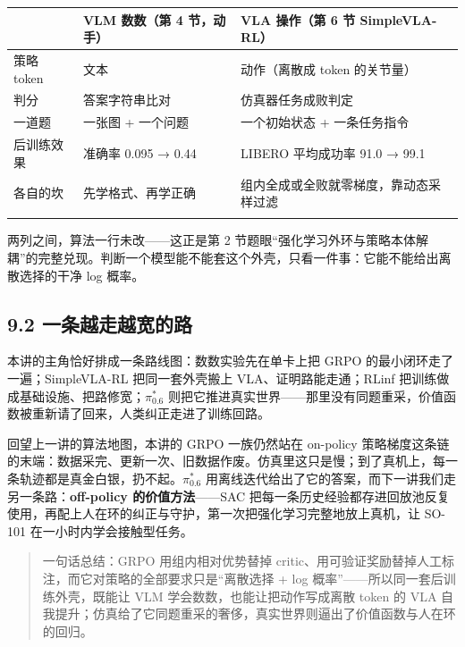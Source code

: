 \documentclass[
  chinese,
]{ctexart}
\begin{document}
\begin{center}
\begin{tabular}{@{}>{\raggedright\arraybackslash}p{} >{\raggedright\arraybackslash}p{} >{\raggedright\arraybackslash}p{}@{}}
\toprule\noalign{}
 & VLM 数数（第 4 节，动手） & VLA 操作（第 6 节 SimpleVLA-RL） \\
\midrule\noalign{}
策略 token & 文本 & 动作（离散成 token 的关节量） \\
判分 & 答案字符串比对 & 仿真器任务成败判定 \\
一道题 & 一张图 + 一个问题 & 一个初始状态 + 一条任务指令 \\
后训练效果 & 准确率 0.095 → 0.44 & LIBERO 平均成功率 91.0 → 99.1 \\
各自的坎 & 先学格式、再学正确 & 组内全成或全败就零梯度，靠动态采样过滤 \\
\bottomrule\noalign{}
\end{tabular}
\end{center}

两列之间，算法一行未改------这正是第 2
节题眼``强化学习外环与策略本体解耦''的完整兑现。判断一个模型能不能套这个外壳，只看一件事：它能不能给出离散选择的干净
log 概率。

\subsection{9.2
一条越走越宽的路}\label{ux4e00ux6761ux8d8aux8d70ux8d8aux5bbdux7684ux8def}

本讲的主角恰好排成一条路线图：数数实验先在单卡上把 GRPO
的最小闭环走了一遍；SimpleVLA-RL 把同一套外壳搬上
VLA、证明路能走通；RLinf 把训练做成基础设施、把路修宽；\(\pi^{*}_{0.6}\)
则把它推进真实世界------那里没有同题重采，价值函数被重新请了回来，人类纠正走进了训练回路。

回望上一讲的算法地图，本讲的 GRPO 一族仍然站在 on-policy
策略梯度这条链的末端：数据采完、更新一次、旧数据作废。仿真里这只是慢；到了真机上，每一条轨迹都是真金白银，扔不起。\(\pi^{*}_{0.6}\)
用离线迭代给出了它的答案，而下一讲我们走另一条路：\textbf{off-policy
的价值方法}------SAC
把每一条历史经验都存进回放池反复使用，再配上人在环的纠正与守护，第一次把强化学习完整地放上真机，让
SO-101 在一小时内学会接触型任务。

\begin{quote}
一句话总结：GRPO 用组内相对优势替掉
critic、用可验证奖励替掉人工标注，而它对策略的全部要求只是``离散选择 +
log 概率''------所以同一套后训练外壳，既能让 VLM
学会数数，也能让把动作写成离散 token 的 VLA
自我提升；仿真给了它同题重采的奢侈，真实世界则逼出了价值函数与人在环的回归。
\end{quote}
\end{document}
